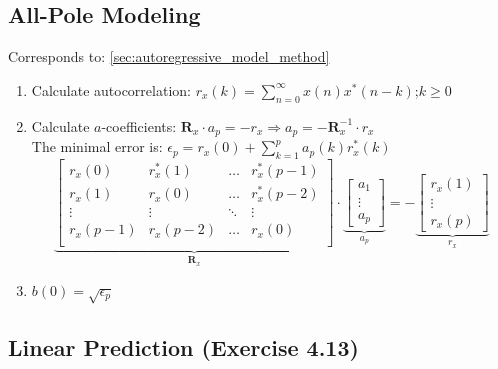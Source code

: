 \subsection{All-Pole Modeling }
Corresponds to: \ref{sec:autoregressive_model_method}
\begin{enumerate}
	\item Calculate autocorrelation: $ r_x(k) = \sum\limits_{n=0}^\infty x(n)x^*(n-k)$;\qquad $k\geq 0$
	\item Calculate $a$-coefficients: $\bm R_x \cdot a_p = -r_x \Longrightarrow a_p = - \bm R_x^{-1} \cdot r_x$ 
  		 \small\\
		The minimal error is: $\epsilon_{p} = r_x(0) + \sum\limits_{k=1}^p a_p(k) r_x^*(k)$
			$$
		\underbrace{\begin{bmatrix}
    		r_x(0) & r_x^*(1) & \hdots & r_x^*(p-1) \\
    		r_x(1) & r_x(0) & \hdots & r_x^*(p-2) \\
    		\vdots & \vdots & \ddots & \vdots \\
    		r_x(p-1) & r_x(p-2) & \hdots & r_x(0) \\
		\end{bmatrix}  }_{\bm R_x} \cdot 
		\underbrace{\begin{bmatrix}
    		a_1 \\
    		\vdots \\
    		a_p
		\end{bmatrix}  }_{a_p}= -\underbrace{\begin{bmatrix}
    		r_x(1) \\
    		\vdots \\
    		r_x(p)
		\end{bmatrix}  }_{r_x}$$ 
	\item $b(0) = \sqrt{\epsilon_p}$ 
\end{enumerate}


\subsection{Linear Prediction  (Exercise 4.13)}

